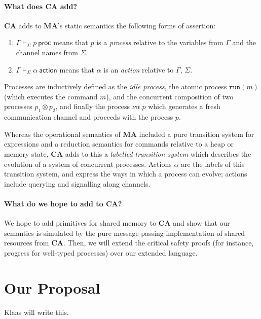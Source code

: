 \documentclass{article}
\newcommand\Lang[1]{{\sffamily\bfseries{#1}}}
\newcommand\LangCA{\Lang{CA}}
\newcommand\LangMA{\Lang{MA}}
\newcommand\IsProc[3]{{#1}\vdash_{#2}{#3}\ \mathsf{proc}}
\newcommand\IsAction[3]{{#1}\vdash_{#2}{#3}\ \mathsf{action}}
\begin{document}
\paragraph{What does \LangCA{} add?}
\LangCA{} adds to \LangMA{}'s static semantics the following forms of
assertion:
\begin{enumerate}
\item $\IsProc{\Gamma}{\Sigma}{p}$ means that $p$ is a \emph{process}
  relative to the variables from $\Gamma$ and the channel names from
  $\Sigma$.
\item $\IsAction{\Gamma}{\Sigma}{\alpha}$ means that $\alpha$ is an
  \emph{action} relative to $\Gamma$, $\Sigma$.
\end{enumerate}

Processes are inductively defined as the \emph{idle process}, the
atomic process $\mathtt{run}(m)$ (which executes the command $m$), and
the concurrent composition of two processes $p_1\otimes p_2$, and
finally the process $\nu\alpha.p$ which generates a fresh
communication channel and proceeds with the process $p$.

Whereas the operational semantics of \LangMA{} included a pure
transition system for expressions and a reduction semantics for
commands relative to a heap or memory state, \LangCA{} adds to this a
\emph{labelled transition system} which describes the evolution of a
system of concurrent processes. Actions $\alpha$ are the labels of
this transition system, and express the ways in which a process can
evolve; actions include querying and signalling along channels.

\paragraph{What do we hope to add to \LangCA{}?}
We hope to add primitives for shared memory to \LangCA{} and show that
our semantics is simulated by the pure message-passing implementation
of shared resources from \LangCA{}. Then, we will extend the critical
safety proofs (for instance, progress for well-typed processes) over
our extended language.

\section{Our Proposal}

Klaas will write this.




\end{document}
